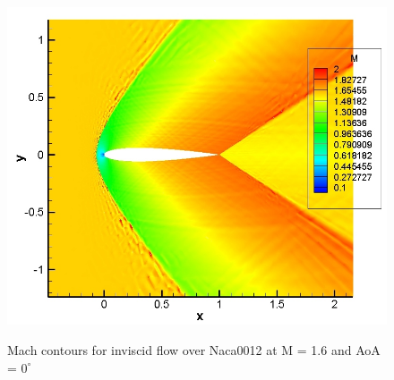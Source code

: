 \begin{figure}[h] \tt
\centering
\includegraphics[angle=0, scale = 0.55]{./figures/M1pt6order3-inv-720ktime-mach.jpg} \\
\caption{Mach contours for inviscid flow over Naca0012 at M = 1.6 and AoA = $0^{\circ} $}
\label{fig:inv_mach}
\end{figure}

